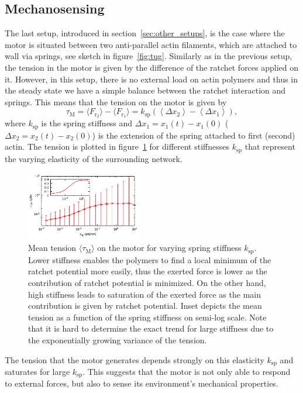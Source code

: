 \documentclass[aps,pre,twocolumn,showpacs,showkeys,superscriptaddress,floatfix]{revtex4-1}
\begin{document}
\subsection{Mechanosensing}
\label{sec:mechanosensing}
The last setup, introduced in section~\ref{sec:other_setups}, is the case where the motor is situated between two anti-parallel actin filaments, which are attached to wall via springs, see sketch in figure~\ref{fig:tug}. 
Similarly as in the previous setup, the tension in the motor is given by the difference of the ratchet forces applied on it.
However, in this setup, there is no external load on actin polymers and thus in the steady state we have a simple balance between the ratchet interaction and springs. 
This means that the tension on the motor is given by
\[
\tau_\text{M} 
= \langle F_{\text{r}_2}\rangle - \langle F_{\text{r}_1} \rangle 
= k_\text{sp} \left( \left\langle \Delta x_2 \right\rangle - \left\langle \Delta x_1 \right\rangle \right) ,
\]
where $k_\text{sp}$ is the spring stiffness and $\Delta x_1 = x_1(t) - x_1(0)$ ($\Delta x_2 = x_2(t) - x_2(0)$) is the extension of the spring attached to first (second) actin. 
The tension is plotted in figure~\ref{fig:tug_k} for different stiffnesses $k_\text{sp}$ that represent the varying elasticity of the surrounding network.
\begin{figure}[t]
\centering
\includegraphics[width=0.45\textwidth,height=!]{tug_k}
\caption{
\label{fig:tug_k}
Mean tension $\langle \tau_\text{M} \rangle$ on the motor for varying spring stiffness $k_\text{sp}$.
Lower stiffness enables the polymers to find a local minimum of the ratchet potential more easily, 
thus the exerted force is lower as the contribution of ratchet potential is minimized. 
On the other hand, high stiffness leads to saturation of the exerted force as the main contribution is given by ratchet potential. 
Inset depicts the mean tension as a function of the spring stiffness on semi-log scale. 
Note that it is hard to determine the exact trend for large stiffness due to the exponentially growing variance of the tension. 
}
\end{figure}
The tension that the motor generates depends strongly on this elasticity $k_\text{sp}$ and saturates for large $k_\text{sp}$. 
This suggests that the motor is not only able to respond to external forces, but also to sense its environment's mechanical properties.
\end{document}
